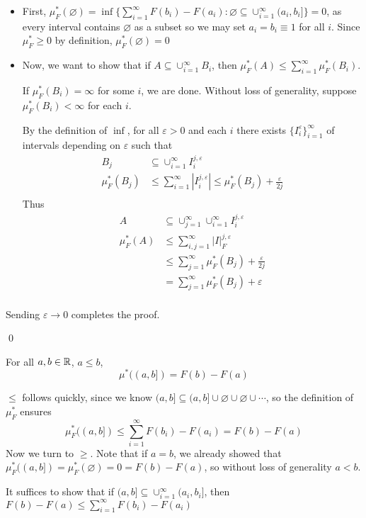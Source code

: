 \documentclass[x11names,reqno,14pt]{extarticle}
\newcommand*{\oo}{\infty}
\newcommand{\seq}[1]{_{#1 = 1}^\oo}
\begin{document}
\begin{itemize}
\item First, $\mu^*_F(\varnothing) = \inf\{\sum\seq{i}F(b_i) - F(a_i) : \varnothing \subseteq \cup\seq{i}(a_i, b_i]\} = 0$, as every interval contains $\varnothing$ as a subset so we may set $a_i = b_i \equiv 1$ for all $i$. Since $\mu^*_F\geq0$ by definition, $\mu^*_F(\varnothing) = 0$
\item Now, we want to show that if $A\subseteq\cup\seq{i}B_i$, then $\mu^*_F(A)\leq\sum\seq{i}\mu^*_F(B_i)$. 

If $\mu^*_F(B_i) = \oo$ for some $i$, we are done. Without loss of generality, suppose $\mu^*_F(B_i)<\oo$ for each $i$. 

By the definition of $\inf$, for all $\varepsilon>0$ and each $i$ there exists $\{I_i^\varepsilon\}\seq{i}$ of intervals depending on $\varepsilon$ such that 
\begin{align*}
B_j & \subseteq\cup\seq{i}I_i^{j, \varepsilon} \\
\mu^*_F(B_j) & \leq \sum\seq{i}|I_i^{j, \varepsilon}| \leq \mu^*_F(B_j) + \frac{\varepsilon}{2j} \\
\end{align*}
Thus
\begin{align*}
A & \subseteq \cup\seq{j}\cup\seq{i}I_i^{j,\varepsilon} \\
\mu^*_F(A) & \leq \sum\seq{i, j}|I|_F^{j, \varepsilon} \\
& \leq \sum\seq{j}\mu^*_F(B_j) + \frac{\varepsilon}{2j} \\
& = \sum\seq{j}\mu^*_F(B_j) + \varepsilon \\
\end{align*}
\end{itemize}

Sending $\varepsilon\to0$ completes the proof. 

\qed

\thm For all $a, b \in \mathbb{R}$, $a \leq b$, 
\[
\mu^*((a, b]) = F(b) - F(a)
\]

\proof

$\leq$ follows quickly, since we know $(a, b]\subseteq (a, b] \cup \varnothing \cup \varnothing \cup \cdots$, so the definition of $\mu^*_F$ ensures
\[
\mu^*_F((a, b]) \leq \sum\seq{i}F(b_i) - F(a_i) = F(b) - F(a)
\]
Now we turn to $\geq$. Note that if $a = b$, we already showed that $\mu^*_F((a, b]) = \mu^*_F(\varnothing) = 0 = F(b) - F(a)$, so without loss of generality $a < b$. 

It suffices to show that if $(a, b]\subseteq\cup\seq{i}(a_i, b_i]$, then $F(b) - F(a) \leq \sum\seq{i}F(b_i) - F(a_i)$
\end{document}
